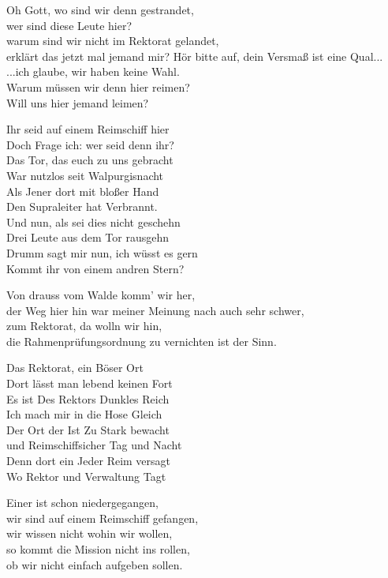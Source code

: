 \begin{verseplay}[10em]
\s{\Legolars} Oh Gott, wo sind wir denn gestrandet,\\
wer sind diese Leute hier?\\
warum sind wir nicht im Rektorat gelandet,\\
erklärt das jetzt mal jemand mir?
\s{\Monk} Hör bitte auf, dein Versmaß ist eine Qual...
\s{\Frodo} ...ich glaube, wir haben keine Wahl.\\
Warum müssen wir denn hier reimen?\\
Will uns hier jemand leimen?

\s{\Paul} Ihr seid auf einem Reimschiff hier\\
Doch Frage ich: wer seid denn ihr?\\
Das Tor, das euch zu uns gebracht\\
War nutzlos seit Walpurgisnacht\\
Als Jener dort mit bloßer Hand \\
Den Supraleiter hat Verbrannt.\\
Und nun, als sei dies nicht geschehn\\
Drei Leute aus dem Tor rausgehn\\
Drumm sagt mir nun, ich wüsst es gern\\
Kommt ihr von einem andren Stern?

\s{\Legolars} Von drauss vom Walde komm' wir her,\\
der Weg hier hin war meiner Meinung nach auch sehr schwer,\\
zum Rektorat, da wolln wir hin,\\
die Rahmenprüfungsordnung zu vernichten ist der Sinn.

\s{\Monk} 

\s{\Spock} Das Rektorat, ein Böser Ort\\
Dort lässt man lebend keinen Fort\\
Es ist Des Rektors Dunkles Reich\\
Ich mach mir in die Hose Gleich\\
Der Ort der Ist Zu Stark bewacht\\
und Reimschiffsicher Tag und Nacht\\
Denn dort ein Jeder Reim versagt\\
Wo Rektor und Verwaltung Tagt

\s{\Frodo} Einer ist schon niedergegangen,\\
wir sind auf einem Reimschiff gefangen,\\
wir wissen nicht wohin wir wollen,\\
so kommt die Mission nicht ins rollen,\\
ob wir nicht einfach aufgeben sollen.


\end{verseplay}
